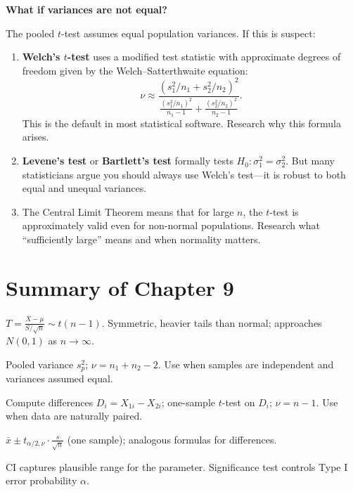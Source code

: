 \documentclass[12pt, a4paper, oneside]{book}
\theoremstyle{definition}
\theoremstyle{plain}
\theoremstyle{remark}
\begin{document}
\begin{exploration}
\textbf{What if variances are not equal?}

The pooled $t$-test assumes equal population variances.  If this is suspect:
\begin{enumerate}
  \item \textbf{Welch's $t$-test} uses a modified test statistic with
        approximate degrees of freedom given by the Welch--Satterthwaite
        equation:
        \[
          \nu \approx \frac{(s_1^2/n_1 + s_2^2/n_2)^2}
                            {\frac{(s_1^2/n_1)^2}{n_1-1}+\frac{(s_2^2/n_2)^2}{n_2-1}}.
        \]
        This is the default in most statistical software.  Research why
        this formula arises.
  \item \textbf{Levene's test} or \textbf{Bartlett's test} formally tests
        $H_0:\sigma_1^2=\sigma_2^2$.  But many statisticians argue you should
        always use Welch's test---it is robust to both equal and unequal variances.
  \item The Central Limit Theorem means that for large $n$, the $t$-test is
        approximately valid even for non-normal populations.  Research what
        ``sufficiently large'' means and when normality matters.
\end{enumerate}
\end{exploration}

\section{Summary of Chapter 9}

\begin{summarybox}
\begin{description}[style=nextline]
  \item[$t$-distribution] $T=\frac{\bar{X}-\mu}{S/\sqrt{n}}\sim t(n-1)$.
    Symmetric, heavier tails than normal; approaches $N(0,1)$ as $n\to\infty$.
  \item[Two-sample $t$-test] Pooled variance $s_p^2$; $\nu=n_1+n_2-2$.
    Use when samples are independent and variances assumed equal.
  \item[Paired $t$-test] Compute differences $D_i=X_{1i}-X_{2i}$;
    one-sample $t$-test on $D_i$; $\nu=n-1$.  Use when data are naturally paired.
  \item[Confidence interval] $\bar{x}\pm t_{\alpha/2,\nu}\cdot\frac{s}{\sqrt{n}}$ (one sample);
    analogous formulas for differences.
  \item[Interpretation] CI captures plausible range for the parameter.
    Significance test controls Type I error probability $\alpha$.
\end{description}
\end{summarybox}
\end{document}
